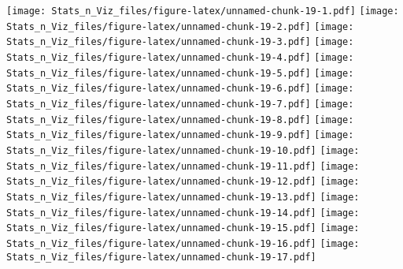 \documentclass[
]{article}
\newenvironment{Shaded}{\begin{snugshade}}{\end{snugshade}}
\newcommand{\AttributeTok}[1]{\textcolor[rgb]{0.77,0.63,0.00}{#1}}
\newcommand{\CommentTok}[1]{\textcolor[rgb]{0.56,0.35,0.01}{\textit{#1}}}
\newcommand{\ConstantTok}[1]{\textcolor[rgb]{0.00,0.00,0.00}{#1}}
\newcommand{\ControlFlowTok}[1]{\textcolor[rgb]{0.13,0.29,0.53}{\textbf{#1}}}
\newcommand{\DecValTok}[1]{\textcolor[rgb]{0.00,0.00,0.81}{#1}}
\newcommand{\FunctionTok}[1]{\textcolor[rgb]{0.00,0.00,0.00}{#1}}
\newcommand{\NormalTok}[1]{#1}
\newcommand{\OtherTok}[1]{\textcolor[rgb]{0.56,0.35,0.01}{#1}}
\newcommand{\SpecialCharTok}[1]{\textcolor[rgb]{0.00,0.00,0.00}{#1}}
\begin{document}
\begin{Shaded}
\end{Shaded}

\texttt{[image: Stats\_n\_Viz\_files/figure-latex/unnamed-chunk-19-1.pdf]}
\texttt{[image: Stats\_n\_Viz\_files/figure-latex/unnamed-chunk-19-2.pdf]}
\texttt{[image: Stats\_n\_Viz\_files/figure-latex/unnamed-chunk-19-3.pdf]}
\texttt{[image: Stats\_n\_Viz\_files/figure-latex/unnamed-chunk-19-4.pdf]}
\texttt{[image: Stats\_n\_Viz\_files/figure-latex/unnamed-chunk-19-5.pdf]}
\texttt{[image: Stats\_n\_Viz\_files/figure-latex/unnamed-chunk-19-6.pdf]}
\texttt{[image: Stats\_n\_Viz\_files/figure-latex/unnamed-chunk-19-7.pdf]}
\texttt{[image: Stats\_n\_Viz\_files/figure-latex/unnamed-chunk-19-8.pdf]}
\texttt{[image: Stats\_n\_Viz\_files/figure-latex/unnamed-chunk-19-9.pdf]}
\texttt{[image: Stats\_n\_Viz\_files/figure-latex/unnamed-chunk-19-10.pdf]}
\texttt{[image: Stats\_n\_Viz\_files/figure-latex/unnamed-chunk-19-11.pdf]}
\texttt{[image: Stats\_n\_Viz\_files/figure-latex/unnamed-chunk-19-12.pdf]}
\texttt{[image: Stats\_n\_Viz\_files/figure-latex/unnamed-chunk-19-13.pdf]}
\texttt{[image: Stats\_n\_Viz\_files/figure-latex/unnamed-chunk-19-14.pdf]}
\texttt{[image: Stats\_n\_Viz\_files/figure-latex/unnamed-chunk-19-15.pdf]}
\texttt{[image: Stats\_n\_Viz\_files/figure-latex/unnamed-chunk-19-16.pdf]}
\texttt{[image: Stats\_n\_Viz\_files/figure-latex/unnamed-chunk-19-17.pdf]}
\end{document}
